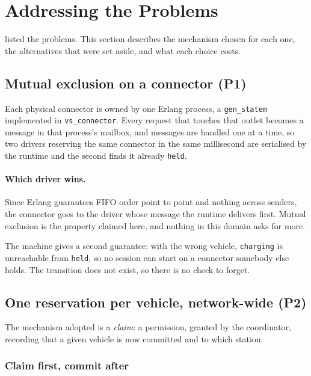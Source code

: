 \section{Addressing the Problems}
\label{sec:addressing}

 listed the problems. This section describes the mechanism
chosen for each one, the alternatives that were set aside, and what each choice
costs.

\subsection{Mutual exclusion on a connector (P1)}
\label{sec:p1}

Each physical connector is owned by one Erlang process, a \texttt{gen\_statem}
implemented in \texttt{vs\_connector}. Every request that touches that outlet
becomes a message in that process's mailbox, and messages are handled one at a
time, so two drivers reserving the same connector in the same millisecond are
serialised by the runtime and the second finds it already \texttt{held}.

\paragraph{Which driver wins.} Since Erlang guarantees FIFO order point to point
and nothing across senders, the connector goes to the driver whose message the
runtime delivers first. Mutual exclusion is the property claimed here, and nothing
in this domain asks for more.

The machine gives a second guarantee: with the wrong vehicle, \texttt{charging} is
unreachable from \texttt{held}, so no session can start on a connector somebody
else holds. The transition does not exist, so there is no check to forget.

\subsection{One reservation per vehicle, network-wide (P2)}
\label{sec:p2}

The mechanism adopted is a
\emph{claim}: a permission, granted by the coordinator, recording that a given
vehicle is now committed and to which station.

\subsubsection{Claim first, commit after}

